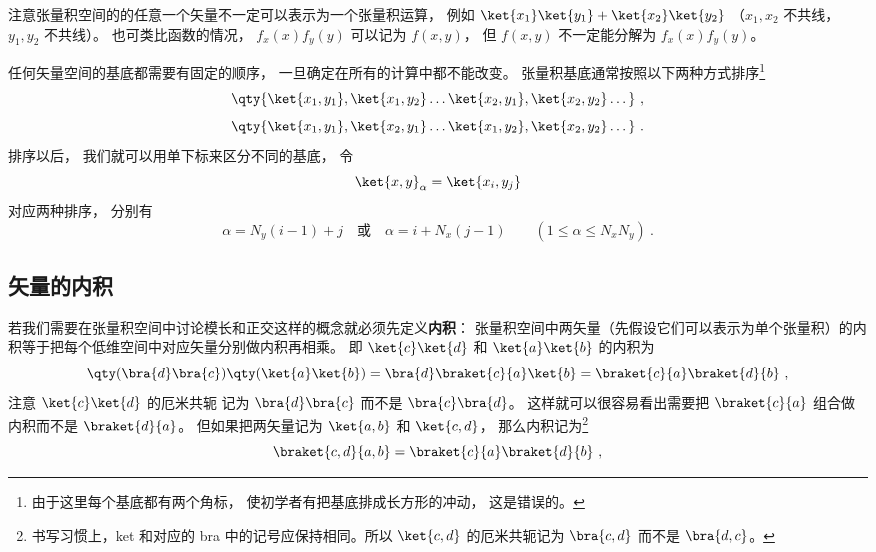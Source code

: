 注意张量积空间的的任意一个矢量不一定可以表示为一个张量积运算， 例如 $\ket{x_1}\ket{y_1} + \ket{x_2}\ket{y_2}$ （$x_1, x_2$ 不共线， $y_1, y_2$ 不共线）。 也可类比函数的情况， $f_x(x)f_y(y)$ 可以记为 $f(x, y)$， 但 $f(x, y)$ 不一定能分解为 $f_x(x)f_y(y)$。

任何矢量空间的基底都需要有固定的顺序， 一旦确定在所有的计算中都不能改变。 张量积基底通常按照以下两种方式排序\footnote{由于这里每个基底都有两个角标， 使初学者有把基底排成长方形的冲动， 这是错误的。}
\begin{equation}\label{DirPro_eq4}
\qty{\ket{x_1, y_1}, \ket{x_1, y_2}\dots  \ket{x_2, y_1}, \ket{x_2, y_2}\dots }~,
\end{equation}
\begin{equation}\label{DirPro_eq5}
\qty{\ket{x_1, y_1}, \ket{x_2, y_1}\dots  \ket{x_1, y_2}, \ket{x_2, y_2}\dots }~.
\end{equation}
排序以后， 我们就可以用单下标来区分不同的基底， 令
\begin{equation}
\ket{x, y}_\alpha = \ket{x_i, y_j}
\end{equation}
对应两种排序， 分别有
\begin{equation}
\alpha = N_y (i-1) + j
\quad \text{或} \quad
\alpha = i + N_x (j-1)
\qquad 
(1 \leqslant \alpha \leqslant N_xN_y)~.
\end{equation}

\subsection{矢量的内积}

若我们需要在张量积空间中讨论模长和正交这样的概念就必须先定义\textbf{内积}： 张量积空间中两矢量（先假设它们可以表示为单个张量积）的内积等于把每个低维空间中对应矢量分别做内积再相乘。 即 $\ket{c}\ket{d}$ 和 $\ket{a}\ket{b}$ 的内积为
\begin{equation}
\qty(\bra{d}\bra{c})\qty(\ket{a}\ket{b})
= \bra{d}\braket{c}{a}\ket{b}
= \braket{c}{a}\braket{d}{b}~,
\end{equation}
注意 $\ket{c}\ket{d}$ 的厄米共轭%
记为 $\bra{d}\bra{c}$ 而不是 $\bra{c}\bra{d}$。 这样就可以很容易看出需要把 $\braket{c}{a}$ 组合做内积而不是 $\braket{d}{a}$。 但如果把两矢量记为 $\ket{a, b}$ 和 $\ket{c, d}$， 那么内积记为\footnote{书写习惯上，ket 和对应的 bra 中的记号应保持相同。所以 $\ket{c, d}$ 的厄米共轭记为 $\bra{c, d}$ 而不是 $\bra{d, c}$。}
\begin{equation}
\braket{c, d}{a, b} = \braket{c}{a}\braket{d}{b}~,
\end{equation}

